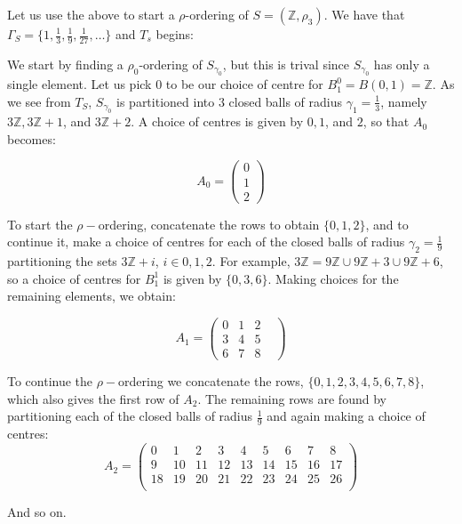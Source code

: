 \begin{example}
Let us use the above to start a $\rho$-ordering of $S=(\mathbb{Z}, \rho_3)$. We have that $\Gamma_S=\{1, \frac{1}{3},\frac{1}{9},\frac{1}{27},\ldots \}$ and $T_s$ begins:

\begin{center}
\end{center}




We start by finding a $\rho_0$-ordering of $S_{\gamma_0}$, but this is trival since $S_{\gamma_0}$ has only a single element. Let us pick $0$ to be our choice of centre for $B^0_1=B(0,1)=\mathbb{Z}$. As we see from $T_S$, $S_{\gamma_0}$ is partitioned into $3$ closed balls of radius $\gamma_1=\frac{1}{3}$, namely $3\mathbb{Z}, 3\mathbb{Z}+1$, and $3\mathbb{Z}+2$. A choice of centres is given by $0,1$, and $2$, so that $A_0$ becomes:

\[A_0=
 \begin{pmatrix}
0 \\
1  \\
2 
\end{pmatrix}
\]


To start the $\rho-$ordering, concatenate the rows to obtain $\{0,1,2\}$, and to continue it, make a choice of centres for each of the closed balls of radius $\gamma_2=\frac{1}{9}$ partitioning the sets $3\mathbb{Z}+i$, $i \in 0,1,2$. For example, $3\mathbb{Z} =  9\mathbb{Z} \cup 9\mathbb{Z}+3 \cup 9\mathbb{Z}+6$, so a choice of centres for $B^1_1$ is given by $\{0,3,6\}$. Making choices for the remaining elements, we obtain: 

\[A_1=
 \begin{pmatrix}
0 & 1 &  2 & \\
3 & 4 &  5 & \\
6 & 7 &  8 &
\end{pmatrix}
\]

To continue the $\rho-$ordering we concatenate the rows, $\{0,1,2,3,4,5,6,7,8\}$, which also gives the first row of $A_2$. The remaining rows are found by partitioning each of the closed balls of radius $\frac{1}{9}$ and again making a choice of centres:
\[A_2=
 \begin{pmatrix}
0 & 1 &  2 & 3 & 4 & 5 & 6 & 7 & 8 \\
9 & 10 &  11 & 12 & 13 & 14 & 15 & 16 & 17 \\
18 & 19 &  20 & 21 & 22 & 23 & 24 & 25 & 26 \\
\end{pmatrix}
\]

And so on. 
\end{example}

